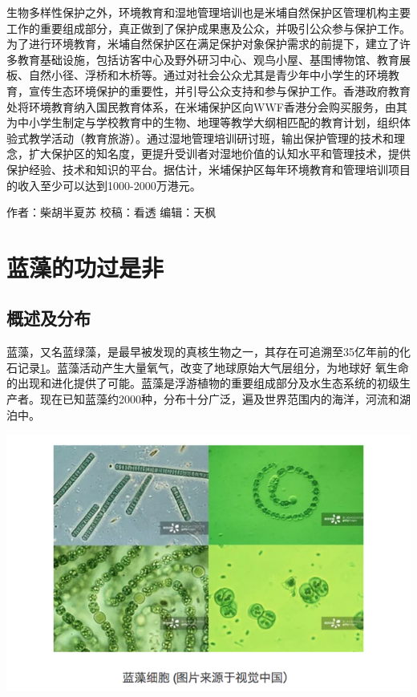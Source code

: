 \documentclass[]{book}
\begin{document}
生物多样性保护之外，环境教育和湿地管理培训也是米埔自然保护区管理机构主要工作的重要组成部分，真正做到了保护成果惠及公众，并吸引公众参与保护工作。为了进行环境教育，米埔自然保护区在满足保护对象保护需求的前提下，建立了许多教育基础设施，包括访客中心及野外研习中心、观鸟小屋、基围博物馆、教育展板、自然小径、浮桥和木桥等。通过对社会公众尤其是青少年中小学生的环境教育，宣传生态环境保护的重要性，并引导公众支持和参与保护工作。香港政府教育处将环境教育纳入国民教育体系，在米埔保护区向WWF香港分会购买服务，由其为中小学生制定与学校教育中的生物、地理等教学大纲相匹配的教育计划，组织体验式教学活动（教育旅游）。通过湿地管理培训研讨班，输出保护管理的技术和理念，扩大保护区的知名度，更提升受训者对湿地价值的认知水平和管理技术，提供保护经验、技术和知识的平台。据估计，米埔保护区每年环境教育和管理培训项目的收入至少可以达到1000-2000万港元。

作者：柴胡半夏苏
校稿：看透
编辑：天枫

\hypertarget{ux84ddux85fbux7684ux529fux8fc7ux662fux975e}{%
\section{蓝藻的功过是非}\label{ux84ddux85fbux7684ux529fux8fc7ux662fux975e}}

\hypertarget{ux6982ux8ff0ux53caux5206ux5e03}{%
\subsection{概述及分布}\label{ux6982ux8ff0ux53caux5206ux5e03}}

蓝藻，又名蓝绿藻，是最早被发现的真核生物之一，其存在可追溯至35亿年前的化石记录\href{陈心想，耿增超。西北农林科技大学学报（自然科学版），2013，41:\%20167-174．}{1}。蓝藻活动产生大量氧气，改变了地球原始大气层组分，为地球好 氧生命的出现和进化提供了可能。蓝藻是浮游植物的重要组成部分及水生态系统的初级生产者。现在已知蓝藻约2000种，分布十分广泛，遍及世界范围内的海洋，河流和湖泊中。

\includegraphics[width=8.33in]{images/lanzao1}
\end{document}
